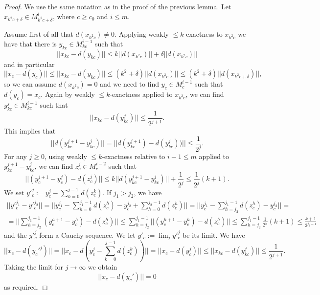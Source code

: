 \begin{proof}
We use the same notation as in the proof of the previous lemma. Let $x_{k^2c + \delta} \in M^i_{k^2c + \delta}$, where $c \geq c_0$ and $i \leq m$.

Assume first of all that $d(x_{k^2c}) \neq 0$. Applying weakly $\leq k$-exactness to $x_{k^2c}$ we have that there is $y_{kc} \in M^{i-1}_{kc}$ such that
\[
|| x_{kc} - d(y_{kc}) || \leq k||d(x_{k^2c})|| + \delta ||d(x_{k^2c})||
\]
and in particular
\[
|| x_c - d(y_c) || \leq || x_{kc} - d(y_{kc}) || \leq (k^2 + \delta)||d(x_{k^2c})|| \leq (k^2 + \delta)||d(x_{k^2c + \delta})||,
\]
so we can assume $d(x_{k^2c}) = 0$ and we need to find $y_c \in M^{i-1}_c$ such that $d(y_c) = x_c$. Again by weakly $\leq k$-exactness applied to $x_{k^2c}$, we can find $y_{kc}^j \in M^{i-1}_{kc}$ such that
\[
|| x_{kc} - d(y_{kc}^j) || \leq \frac{1}{2^{j+1}}.
\]
This implies that
\[
||d(y_{kc}^{j+1} - y_{kc}^j)|| = ||d(y_{kc}^{j+1}) - d(y_{kc}^j))|| \leq \frac{1}{2^j}.
\]
For any $j \geq 0$, using weakly $\leq k$-exactness relative to $i-1 \leq m$ applied to $y_{kc}^{j+1} - y_{kc}^j$, we can find $z^j_c \in M^{i-2}_c$ such that
\[
||(y_c^{j+1} - y_c^j) - d(z^j_c)|| \leq k||d(y_{kc}^{j+1} - y_{kc}^j)|| + \frac{1}{2^j} \leq \frac{1}{2^j}(k+1).
\]
We set $y'^j_c := y_c^j - \sum_{k=0}^{j-1} d(z_c^k)$. If $j_1 > j_2$, we have
\[ \begin{aligned}
||y'^{j_1}_c - y'^{j_2}_c|| = || y_c^{j_1} - \sum_{h=0}^{j_1-1} d(z_c^h) - y_c^{j_2} + \sum_{h=0}^{j_2-1} d(z_c^h) || = || y_c^{j_1} - \sum_{h=j_2}^{j_1-1} d(z_c^h) - y_c^{j_2} || = \\
= || \sum_{h = j_2}^{j_1 - 1} (y_c^{h+1} - y_c^h) - d(z_c^h) || \leq \sum_{h = j_2}^{j_1 - 1} || (y_c^{h+1} - y_c^h) - d(z_c^h) || \leq \sum_{h = j_2}^{j_1 - 1} \frac{1}{2^h}(k+1) \leq \frac{k+1}{2^{j_2 - 1}}
\end{aligned}\]
and the $y'^j_c$ form a Cauchy sequence. We let $y'_c := \lim_j y'^j_c$ be its limit. We have
\[
|| x_c - d(y_c'^j) || = || x_c - d(y_c^j - \sum_{k=0}^{j-1} d(z_c^k)) || = || x_c - d(y_c^j) || \leq || x_{kc} - d(y_{kc}^j) || \leq \frac{1}{2^{j+1}}.
\]
Taking the limit for $j \to \infty$ we obtain
\[
 || x_c - d(y_c') || = 0
\]
as required.
\end{proof}

